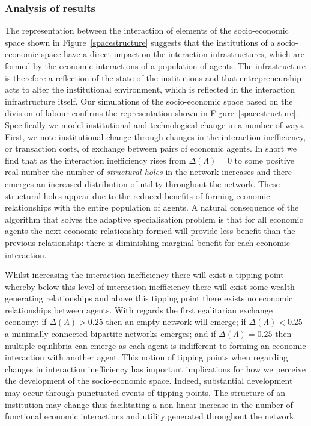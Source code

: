 \subsubsection{Analysis of results} %
\label{sub:analysis_of_results}


The representation between the interaction of elements of the socio-economic space shown in Figure~\ref{spacestructure} suggests that the institutions of a socio-economic space have a direct impact on the interaction infrastructures, which are formed by the economic interactions of a population of agents. The infrastructure is therefore a reflection of the state of the institutions and that entrepreneurship acts to alter the institutional environment, which is reflected in the interaction infrastructure itself. Our simulations of the socio-economic space based on the division of labour confirms the representation shown in Figure~\ref{spacestructure}. Specifically we model institutional and technological change in a number of ways. First, we note institutional change through changes in the interaction inefficiency, or transaction costs, of exchange between pairs of economic agents. In short we find that as the interaction inefficiency rises from $\Delta(\Lambda) = 0$ to some positive real number the number of \emph{structural holes} in the network increases and there emerges an increased distribution of utility throughout the network. These structural holes appear due to the reduced benefits of forming economic relationships with the entire population of agents. A natural consequence of the algorithm that solves the adaptive specialisation problem is that for all economic agents the next economic relationship formed will provide less benefit than the previous relationship: there is diminishing marginal benefit for each economic interaction. 

Whilst increasing the interaction inefficiency there will exist a tipping point whereby below this level of interaction inefficiency there will exist some wealth-generating relationships and above this tipping point there exists no economic relationships between agents. With regards the first egalitarian exchange economy: if $\Delta(\Lambda) > 0.25$ then an empty network will emerge; if $\Delta(\Lambda) < 0.25$ a minimally connected bipartite networks emerges; and if $\Delta(\Lambda) = 0.25$ then multiple equilibria can emerge as each agent is indifferent to forming an economic interaction with another agent. This notion of tipping points when regarding changes in interaction inefficiency has important implications for how we perceive the development of the socio-economic space. Indeed, substantial development may occur through punctuated events of tipping points. The structure of an institution may change thus facilitating a non-linear increase in the number of functional economic interactions and utility generated throughout the network.

